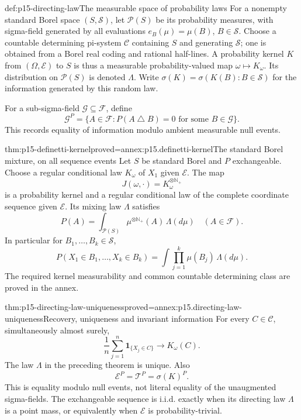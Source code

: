 \begin{hbdefinition}{def:p15-directing-law}{The measurable space of probability laws}
For a nonempty standard Borel space \((S,\mathcal S)\), let
\(\mathscr P(S)\) be its probability measures, with sigma-field
generated by all evaluations \(e_B(\mu)=\mu(B)\), \(B\in\mathcal S\).
Choose a countable determining pi-system \(\mathcal C\) containing \(S\)
and generating \(\mathcal S\); one is obtained from a Borel real coding
and rational half-lines.
A probability kernel \(K\) from \((\Omega,\mathcal E)\) to \(S\)
is thus a measurable probability-valued map \(\omega\mapsto K_\omega\).
Its distribution on \(\mathscr P(S)\) is denoted \(\Lambda\).
Write \(\sigma(K)=\sigma(K(B):B\in\mathcal S)\) for the information
generated by this random law.

For a sub-sigma-field \(\mathcal G\subseteq\mathcal F\), define
\[
 \mathcal G^{P}=\{A\in\mathcal F:
                 P(A\mathbin{\triangle}B)=0\text{ for some }B\in\mathcal G\}.
\]
This records equality of information modulo ambient measurable null events.
\end{hbdefinition}

\begin{hbtheorem}{thm:p15-definetti-kernel}{proved=annex:p15.definetti-kernel}{The standard Borel mixture, on all sequence events}
Let \(S\) be standard Borel and \(P\) exchangeable.
Choose a regular conditional law \(K_\omega\) of \(X_1\) given
\(\mathcal E\). The map
\[
                         J(\omega,\cdot)=K_\omega^{\otimes\mathbb N_+}
\]
is a probability kernel and a regular conditional law of the complete
coordinate sequence given \(\mathcal E\).
Its mixing law \(\Lambda\) satisfies
\[
                  P(A)=\int_{\mathscr P(S)}
                          \mu^{\otimes\mathbb N_+}(A)\,\Lambda(d\mu)
                                      \quad(A\in\mathcal F).
\]
In particular for \(B_1,\ldots,B_k\in\mathcal S\),
\[
 P(X_1\in B_1,\ldots,X_k\in B_k)
           =\int\prod_{j=1}^k\mu(B_j)\,\Lambda(d\mu).
\]
The required kernel measurability and common countable determining
class are proved in the annex.
\end{hbtheorem}

\begin{hbtheorem}{thm:p15-directing-law-uniqueness}{proved=annex:p15.directing-law-uniqueness}{Recovery, uniqueness and invariant information}
For every \(C\in\mathcal C\), simultaneously almost surely,
\[
                   \frac1n\sum_{j=1}^n\mathbf1_{\{X_j\in C\}}
                                 \longrightarrow K_\omega(C).
\]
The law \(\Lambda\) in the preceding theorem is unique.
Also
\[
                      \mathcal E^{P}=\mathcal T^{P}
                                   =\sigma(K)^{P}.
\]
This is equality modulo null events, not literal equality of the
unaugmented sigma-fields.
The exchangeable sequence is i.i.d. exactly when its directing law
\(\Lambda\) is a point mass, or equivalently when
\(\mathcal E\) is probability-trivial.
\end{hbtheorem}

